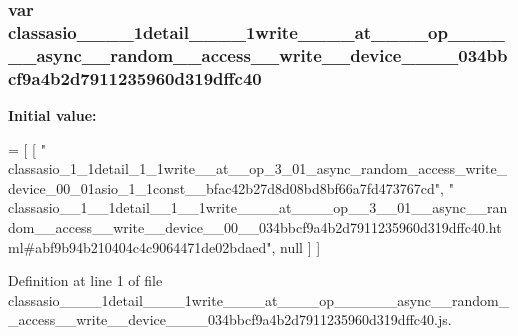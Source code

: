 \subsubsection[{classasio\+\_\+\+\_\+1\+\_\+\+\_\+1detail\+\_\+\+\_\+1\+\_\+\+\_\+1write\+\_\+\+\_\+\+\_\+\+\_\+at\+\_\+\+\_\+\+\_\+\+\_\+op\+\_\+\+\_\+3\+\_\+\+\_\+01\+\_\+\+\_\+async\+\_\+\+\_\+random\+\_\+\+\_\+access\+\_\+\+\_\+write\+\_\+\+\_\+device\+\_\+\+\_\+00\+\_\+\+\_\+034bbcf9a4b2d7911235960d319dffc40}]{\setlength{\rightskip}{0pt plus 5cm}var classasio\+\_\+\+\_\+\_\+\+\_\+1detail\+\_\+\+\_\+\_\+\+\_\+1write\+\_\+\+\_\+\+\_\+\+\_\+at\+\_\+\+\_\+\+\_\+\+\_\+op\+\_\+\+\_\+\_\+\+\_\+\_\+\+\_\+async\+\_\+\+\_\+random\+\_\+\+\_\+access\+\_\+\+\_\+write\+\_\+\+\_\+device\+\_\+\+\_\+\_\+\+\_\+034bbcf9a4b2d7911235960d319dffc40}\label{classasio____1____1detail____1____1write________at________op____3____01____async____random____ac93d102b542ec9f77fd2cfc30a1738f2f_a94bc94c1075e7b24bcc6c97c00a73804}
{\bfseries Initial value\+:}
\begin{DoxyCode}
=
[
    [ \textcolor{stringliteral}{"
      classasio\_1\_1detail\_1\_1write\_\_at\_\_op\_3\_01\_async\_random\_access\_write\_device\_00\_01asio\_1\_1const\_\_bfac42b27d8d08bd8bf66a7fd473767cd"}, \textcolor{stringliteral}{"
      classasio\_\_1\_\_1detail\_\_1\_\_1write\_\_\_\_at\_\_\_\_op\_\_3\_\_01\_\_async\_\_random\_\_access\_\_write\_\_device\_\_00\_\_034bbcf9a4b2d7911235960d319dffc40.html#abf9b94b210404c4c9064471de02bdaed"}, null ]
]
\end{DoxyCode}


Definition at line 1 of file classasio\+\_\+\+\_\+\_\+\+\_\+1detail\+\_\+\+\_\+\_\+\+\_\+1write\+\_\+\+\_\+\+\_\+\+\_\+at\+\_\+\+\_\+\+\_\+\+\_\+op\+\_\+\+\_\+\_\+\+\_\+\_\+\+\_\+async\+\_\+\+\_\+random\+\_\+\+\_\+access\+\_\+\+\_\+write\+\_\+\+\_\+device\+\_\+\+\_\+\_\+\+\_\+034bbcf9a4b2d7911235960d319dffc40.\+js.

